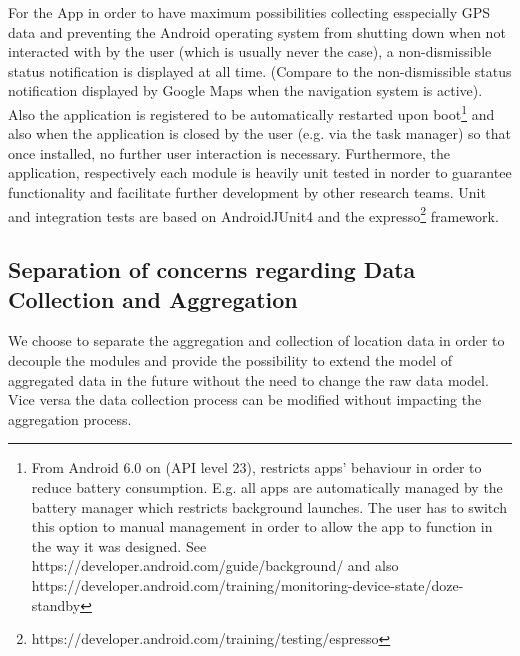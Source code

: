 For the App in order to have maximum possibilities collecting esspecially GPS data and preventing the Android operating system from shutting down when not interacted with by the user (which is usually never the case), a non-dismissible status notification is displayed at all time. (Compare to the non-dismissible status notification displayed by Google Maps when the navigation system is active). Also the application is registered to be automatically restarted upon boot\footnote{From Android 6.0 on (API level 23), restricts apps' behaviour in order to reduce battery consumption. E.g. all apps are automatically managed by the battery manager which restricts background launches. The user has to switch this option to manual management in order to allow the app to function in the way it was designed. See https://developer.android.com/guide/background/ and also https://developer.android.com/training/monitoring-device-state/doze-standby} and also when the application is closed by the user (e.g. via the task manager) so that once installed, no further user interaction is necessary.
Furthermore, the application, respectively each module is heavily unit tested in norder to guarantee functionality and facilitate further development by other research teams. Unit and integration tests are based on AndroidJUnit4 and the expresso\footnote{https://developer.android.com/training/testing/espresso} framework.

\subsection{Separation of concerns regarding Data Collection and Aggregation}
We choose to separate the aggregation and collection of location data in order to decouple the modules and provide the possibility to extend the model of aggregated data in the future without the need to change the raw data model. Vice versa the data collection process can be modified without impacting the aggregation process.

